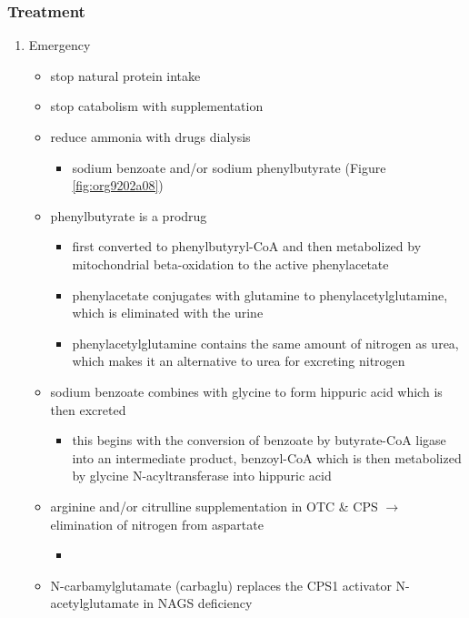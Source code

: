 \documentclass[12pt]{scrartcl}
\begin{document}
\begin{center}
\begin{center}
\subsubsection{Treatment}
\label{sec:org002f9aa}
\begin{enumerate}
\item Emergency
\label{sec:orgfccfbdc}
\begin{itemize}
\item stop natural protein intake
\item stop catabolism with supplementation
\item reduce ammonia with drugs \textpm{} dialysis
\begin{itemize}
\item sodium benzoate and/or sodium phenylbutyrate (Figure \ref{fig:org9202a08})
\end{itemize}

\item phenylbutyrate is a prodrug
\begin{itemize}
\item first converted to phenylbutyryl-CoA and then metabolized by mitochondrial
beta-oxidation to the active phenylacetate
\item phenylacetate conjugates with glutamine to phenylacetylglutamine,
which is eliminated with the urine
\item phenylacetylglutamine contains the same amount of nitrogen as
urea, which makes it an alternative to urea for excreting nitrogen
\end{itemize}

\item sodium benzoate combines with glycine to form hippuric acid which is
then excreted
\begin{itemize}
\item this begins with the conversion of benzoate by butyrate-CoA ligase
into an intermediate product, benzoyl-CoA which is then
metabolized by glycine N-acyltransferase into hippuric acid
\end{itemize}
\item arginine and/or citrulline supplementation in OTC \& CPS \(\to\) elimination of nitrogen from aspartate
\begin{itemize}
\item {}
\end{itemize}
\item N-carbamylglutamate (carbaglu) replaces the CPS1 activator N-acetylglutamate in NAGS deficiency
\end{itemize}




\end{enumerate}
\end{center}
\end{center}
\end{document}
